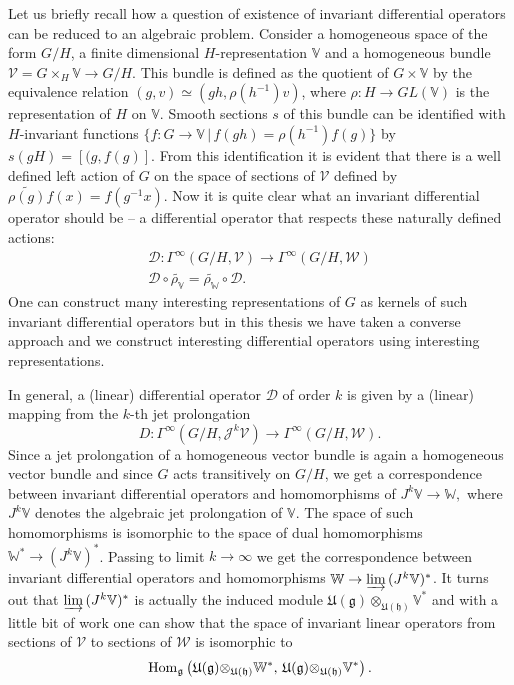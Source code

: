 \documentclass[12pt,a4paper,final]{report}
\begin{document}
 Let us briefly recall how a question of existence of invariant differential operators can be reduced to an algebraic problem. Consider a homogeneous space of the form $G/H$, a finite dimensional $H$-representation $\mathbb{V}$ and a homogeneous bundle $\mathcal{V} = G \times_H \mathbb{V} \to G/H$. This bundle is defined as the quotient of $G\times \mathbb{V}$ by the equivalence relation $(g, v) \simeq (gh, \rho(h^{-1}) v)$, where $\rho: H \to GL(\mathbb{V})$ is the representation of $H$ on $\mathbb{V}.$ Smooth sections $s$ of this bundle can be identified with $H$-invariant functions $\{ f \colon G \to \mathbb{V} \,|\, f(gh) = \rho(h^{-1}) f(g)\}$  by $s(gH) = [(g, f(g)].$ From this identification it is evident that there is a well defined left action of $G$ on the space of sections of $\mathcal{V}$ defined by $\widetilde{\rho(g)} f (x) = f(g^{-1}x)$. Now it is quite clear what an invariant differential operator should be -- a differential operator that respects these naturally defined actions:
\begin{gather*}
\mathcal{D} \colon \Gamma^\infty(G/H, \mathcal{V}) \to \Gamma^\infty(G/H, \mathcal{W}) \\
\mathcal{D} \circ \widetilde{\rho_\mathbb{V}} =  \widetilde{\rho_\mathbb{W}} \circ \mathcal{D}.
\end{gather*}
One can construct many interesting representations of $G$ as kernels of such invariant differential operators but in this thesis we have taken a converse approach and we construct interesting differential operators using interesting representations. 

 In general, a (linear) differential operator $\mathcal{D}$ of order $k$ is given by a (linear) mapping from the $k$-th jet prolongation 
\[
D\colon \Gamma^\infty(G/H,\mathcal{J}^k \mathcal{V}) \to \Gamma^\infty(G/H, \mathcal{W}).
\]
Since a jet prolongation of a homogeneous vector bundle is again a homogeneous vector bundle and since $G$ acts transitively on $G/H$, we get a correspondence between invariant differential operators and homomorphisms of $J^k \mathbb{V} \to \mathbb{W},$ where  $J^k \mathbb{V}$ denotes the algebraic jet prolongation of $\mathbb{V}.$  The space of such homomorphisms is isomorphic to the space of dual homomorphisms $\mathbb{W}^* \to (J^k\mathbb{V})^* $. Passing to limit $k \to \infty$ we get the correspondence between invariant differential operators and homomorphisms $\mathbb{W} \to  \varinjlim \, (J^k\mathbb{V})^* $. It turns out that $\varinjlim \, (J^k\mathbb{V})^*$ is actually the induced module $\mathfrak{U(g)\otimes_{U(h)}} \mathbb{V}^*$  and with a little bit of work one can show that the space of invariant linear operators from sections of $\mathcal{V}$ to sections of $\mathcal{W}$  is isomorphic to 
\[
\mathrm{Hom}_{\mathfrak{g}}\left(\mathfrak{U(g)\otimes_{U(h)}}\mathbb{W}^*, \, \mathfrak{U(g)\otimes_{U(h)}}\mathbb{V}^*\right).
\]
\end{document}

